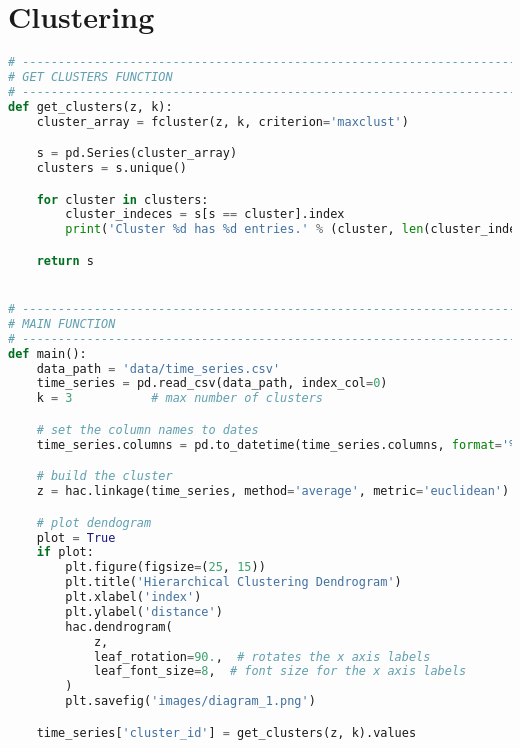 \newpage
\section{Clustering}
\begin{lstlisting}[language=Python]
# ------------------------------------------------------------------------
# GET CLUSTERS FUNCTION
# ------------------------------------------------------------------------
def get_clusters(z, k):
    cluster_array = fcluster(z, k, criterion='maxclust')

    s = pd.Series(cluster_array)
    clusters = s.unique()

    for cluster in clusters:
        cluster_indeces = s[s == cluster].index
        print('Cluster %d has %d entries.' % (cluster, len(cluster_indeces)))

    return s


# ------------------------------------------------------------------------
# MAIN FUNCTION
# ------------------------------------------------------------------------
def main():
    data_path = 'data/time_series.csv'
    time_series = pd.read_csv(data_path, index_col=0)
    k = 3           # max number of clusters

    # set the column names to dates
    time_series.columns = pd.to_datetime(time_series.columns, format='%Y-%m-%d %H:%M:%S')

    # build the cluster
    z = hac.linkage(time_series, method='average', metric='euclidean')

    # plot dendogram
    plot = True
    if plot:
        plt.figure(figsize=(25, 15))
        plt.title('Hierarchical Clustering Dendrogram')
        plt.xlabel('index')
        plt.ylabel('distance')
        hac.dendrogram(
            z,
            leaf_rotation=90.,  # rotates the x axis labels
            leaf_font_size=8,  # font size for the x axis labels
        )
        plt.savefig('images/diagram_1.png')

    time_series['cluster_id'] = get_clusters(z, k).values
    \end{lstlisting}
    
\newpage
